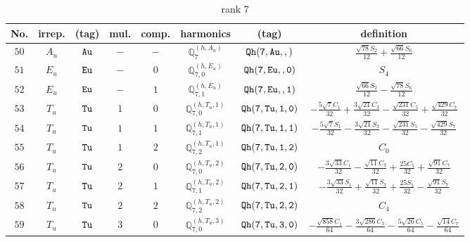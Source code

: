 \documentclass[fleqn,8pt]{jsarticle}
\begin{document}
\begin{table}[ht!]
\begin{center}
\caption{rank 7}
\renewcommand{\arraystretch}{1.3}
\begin{tabular}{cccccccc} \hline \hline
No. & irrep. & (tag) & mul. & comp. & harmonics & (tag) & definition \\ \hline
$ 50 $ & $ A_{u} $ & $ {\tt Au} $ & $ - $ & $ - $ & $ \mathbb{Q}_{7}^{(h,A_{u})} $ & $ {\tt Qh(7,Au,,)} $ & $ \frac{\sqrt{78} S_{2}}{12} + \frac{\sqrt{66} S_{6}}{12} $ \\
$ 51 $ & $ E_{u} $ & $ {\tt Eu} $ & $ - $ & $ 0 $ & $ \mathbb{Q}_{7,0}^{(h,E_{u})} $ & $ {\tt Qh(7,Eu,,0)} $ & $ S_{4} $ \\
$ 52 $ & $ E_{u} $ & $ {\tt Eu} $ & $ - $ & $ 1 $ & $ \mathbb{Q}_{7,1}^{(h,E_{u})} $ & $ {\tt Qh(7,Eu,,1)} $ & $ \frac{\sqrt{66} S_{2}}{12} - \frac{\sqrt{78} S_{6}}{12} $ \\
$ 53 $ & $ T_{u} $ & $ {\tt Tu} $ & $ 1 $ & $ 0 $ & $ \mathbb{Q}_{7,0}^{(h,T_{u},1)} $ & $ {\tt Qh(7,Tu,1,0)} $ & $ - \frac{5 \sqrt{7} C_{1}}{32} + \frac{3 \sqrt{21} C_{3}}{32} - \frac{\sqrt{231} C_{5}}{32} + \frac{\sqrt{429} C_{7}}{32} $ \\
$ 54 $ & $ T_{u} $ & $ {\tt Tu} $ & $ 1 $ & $ 1 $ & $ \mathbb{Q}_{7,1}^{(h,T_{u},1)} $ & $ {\tt Qh(7,Tu,1,1)} $ & $ - \frac{5 \sqrt{7} S_{1}}{32} - \frac{3 \sqrt{21} S_{3}}{32} - \frac{\sqrt{231} S_{5}}{32} - \frac{\sqrt{429} S_{7}}{32} $ \\
$ 55 $ & $ T_{u} $ & $ {\tt Tu} $ & $ 1 $ & $ 2 $ & $ \mathbb{Q}_{7,2}^{(h,T_{u},1)} $ & $ {\tt Qh(7,Tu,1,2)} $ & $ C_{0} $ \\
$ 56 $ & $ T_{u} $ & $ {\tt Tu} $ & $ 2 $ & $ 0 $ & $ \mathbb{Q}_{7,0}^{(h,T_{u},2)} $ & $ {\tt Qh(7,Tu,2,0)} $ & $ - \frac{3 \sqrt{33} C_{1}}{32} - \frac{\sqrt{11} C_{3}}{32} + \frac{25 C_{5}}{32} + \frac{\sqrt{91} C_{7}}{32} $ \\
$ 57 $ & $ T_{u} $ & $ {\tt Tu} $ & $ 2 $ & $ 1 $ & $ \mathbb{Q}_{7,1}^{(h,T_{u},2)} $ & $ {\tt Qh(7,Tu,2,1)} $ & $ - \frac{3 \sqrt{33} S_{1}}{32} + \frac{\sqrt{11} S_{3}}{32} + \frac{25 S_{5}}{32} - \frac{\sqrt{91} S_{7}}{32} $ \\
$ 58 $ & $ T_{u} $ & $ {\tt Tu} $ & $ 2 $ & $ 2 $ & $ \mathbb{Q}_{7,2}^{(h,T_{u},2)} $ & $ {\tt Qh(7,Tu,2,2)} $ & $ C_{4} $ \\
$ 59 $ & $ T_{u} $ & $ {\tt Tu} $ & $ 3 $ & $ 0 $ & $ \mathbb{Q}_{7,0}^{(h,T_{u},3)} $ & $ {\tt Qh(7,Tu,3,0)} $ & $ - \frac{\sqrt{858} C_{1}}{64} - \frac{3 \sqrt{286} C_{3}}{64} - \frac{5 \sqrt{26} C_{5}}{64} - \frac{\sqrt{14} C_{7}}{64} $ \\

\end{tabular}
\end{center}
\end{table}
\end{document}
